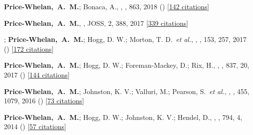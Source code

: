 \item[{\color{deemph}\scriptsize6}]\textbf{Price-Whelan,~A.~M.}; Bonaca, A., , \apj, 863, 2018 () [\href{http://adsabs.harvard.edu/abs/2018ApJ...863L..20P}{142 citations}]

\item[{\color{deemph}\scriptsize5}]\textbf{Price-Whelan,~A.~M.}, , JOSS, 2, 388, 2017 [\href{http://adsabs.harvard.edu/abs/2017JOSS....2..388P}{339 citations}]

\item[{\color{deemph}\scriptsize4}]; \textbf{Price-Whelan,~A.~M.}; Hogg, D. W.; Morton, T. D.~\textit{et al.}, , \aj, 153, 257, 2017 () [\href{http://adsabs.harvard.edu/abs/2017AJ....153..257O}{172 citations}]

\item[{\color{deemph}\scriptsize3}]\textbf{Price-Whelan,~A.~M.}; Hogg, D. W.; Foreman-Mackey, D.; Rix, H., , \apj, 837, 20, 2017 () [\href{http://adsabs.harvard.edu/abs/2017ApJ...837...20P}{144 citations}]

\item[{\color{deemph}\scriptsize2}]\textbf{Price-Whelan,~A.~M.}; Johnston, K. V.; Valluri, M.; Pearson, S.~\textit{et al.}, , \mnras, 455, 1079, 2016 () [\href{http://adsabs.harvard.edu/abs/2016MNRAS.455.1079P}{73 citations}]

\item[{\color{deemph}\scriptsize1}]\textbf{Price-Whelan,~A.~M.}; Hogg, D. W.; Johnston, K. V.; Hendel, D., , \apj, 794, 4, 2014 () [\href{http://adsabs.harvard.edu/abs/2014ApJ...794....4P}{57 citations}]